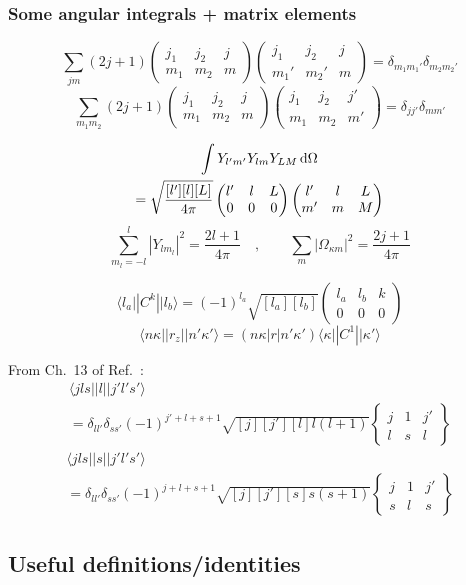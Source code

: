 \documentclass[10pt,twocolumn,a4paper]{article}%
\newcommand{\bra}[1]{\ensuremath{\langle #1|}}	%
\newcommand{\ket}[1]{\ensuremath{|#1\rangle}}	%
\newcommand{\threej}[6]{\ensuremath{\begin{pmatrix}#1&#2&#3\\#4&#5&#6\end{pmatrix}}}	%
\newcommand{\sixj}[6]{\ensuremath{\begin{Bmatrix}#1&#2&#3\\#4&#5&#6\end{Bmatrix}}}	%
\newcommand{\be}{\begin{equation}}
\newcommand{\ee}{\end{equation}}
\def\d{\ensuremath{{\rm d}}}
\renewcommand{\k}{\ensuremath{\kappa}}
\begin{document}
\subsubsection*{Some angular integrals + matrix elements}


\be
\sum_{jm}(2j+1)\threej{j_1}{j_2}{j}{m_1}{m_2}{m}\threej{j_1}{j_2}{j}{m_1'}{m_2'}{m} = \delta_{m_1m_1'}\delta_{m_2m_2'}
\ee
\be
\sum_{m_1m_2}(2j+1)\threej{j_1}{j_2}{j}{m_1}{m_2}{m}\threej{j_1}{j_2}{j'}{m_1}{m_2}{m'} = \delta_{jj'}\delta_{mm'}
\ee



\begin{multline}
\int Y_{l'm'}Y_{lm}Y_{LM}\,\d \Omega \\= \sqrt{\frac{[l'][l][L]}{4\pi}}\threej{l'}{l}{L}{0}{0}{0}\threej{l'}{l}{L}{m'}{m}{M}
\end{multline}
\be
\sum_{m_l=-l}^l |Y_{lm_l}|^2 = \frac{2l+1}{4\pi}\quad,\qquad \sum_m |\Omega_{\k m}|^2 = \frac{2j+1}{4\pi}
\ee



\be
\bra{l_a}|C^k|\ket{l_b} = (-1)^{l_a}\sqrt{[l_a][l_b]}\threej{l_a}{l_b}{k}{0}{0}{0}
\ee
%
\be
\bra{n\k}|r_z|\ket{n'\k'} = ({n\k}|r|{n'\k'})\bra{\k}|C^1|\ket{\k'}
\ee



From Ch.~13 of Ref.~\cite{Varshalovich1988}:
\begin{multline}
\bra{jls}|l|\ket{j'l's'} \\= \delta_{ll'}\delta_{ss'}(-1)^{j'+l+s+1}\sqrt{[j][j'][l]l(l+1)}\sixj{j}{1}{j'}{l}{s}{l}
\end{multline}
%
\begin{multline}
\bra{jls}|s|\ket{j'l's'} \\= \delta_{ll'}\delta_{ss'}(-1)^{j+l+s+1}\sqrt{[j][j'][s]s(s+1)}\sixj{j}{1}{j'}{s}{l}{s}
\end{multline}





\subsection{Useful definitions/identities}
\end{document}
